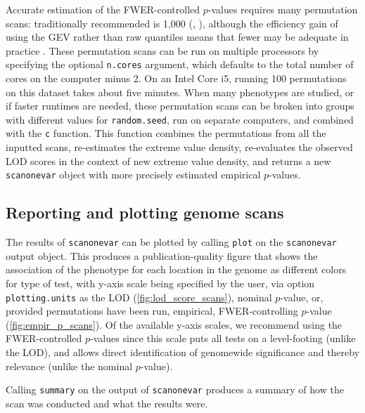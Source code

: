 \documentclass[9pt,twocolumn,twoside]{gsag3jnl}
\begin{document}
Accurate estimation of the FWER-controlled $p$-values requires many permutation scans: traditionally recommended is 1,000 (\eg, \citealt{Churchill1994,Carlborg2002}), although the efficiency gain of using the GEV rather than raw quantiles means that fewer may be adequate in practice \citep{Valdar06cc}.
These permutation scans can be run on multiple processors by specifying the optional \texttt{n.cores} argument, which defaults to the total number of cores on the computer minus 2.
On an Intel Core i5, running 100 permutations on this dataset takes about five minutes.
When many phenotypes are studied, or if faster runtimes are needed, these permutation scans can be broken into groups with different values for \texttt{random.seed}, run on separate computers, and combined with the \texttt{c} function.
This function combines the permutations from all the inputted scans, re-estimates the extreme value density, re-evaluates the observed LOD scores in the context of new extreme value density, and returns a new \texttt{scanonevar} object with more precisely estimated empirical $p$-values.

\subsection*{Reporting and plotting genome scans}

The results of \texttt{scanonevar} can be plotted by calling \texttt{plot} on the \texttt{scanonevar} output object. This produces a publication-quality figure that shows the association of the phenotype for each location in the genome as different colors for type of test, with y-axis scale being specified by the user, via option \texttt{plotting.units} as the LOD (\autoref{fig:lod_score_scans}), nominal $p$-value, or, provided permutations have been run, empirical, FWER-controlling $p$-value (\autoref{fig:empir_p_scans}). Of the available y-axis scales, we recommend using the FWER-controlled $p$-values since this scale puts all tests on a level-footing (unlike the LOD), and allows direct identification of genomewide significance and thereby relevance (unlike the nominal $p$-value).

Calling \texttt{summary} on the output of \texttt{scanonevar} produces a summary of how the scan was conducted and what the results were.


\end{document}
